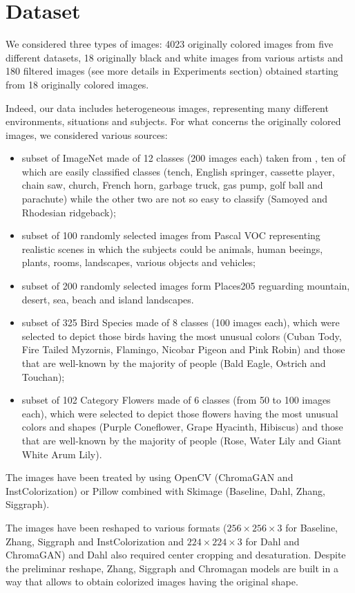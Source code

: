 \section{Dataset}
We considered three types of images: 4023 originally colored images from five different datasets, 18 originally black and white images from various artists and 180 filtered images (see more details in Experiments section) obtained starting from 18 originally colored images.

Indeed, our data includes heterogeneous images, representing many different environments, situations and subjects.
For what concerns the originally colored images, we considered various sources:
\begin{itemize}
	\item subset of ImageNet made of 12 classes (200 images each) taken from \cite{imagenette}, ten of which are easily classified classes (tench, English springer, cassette player, chain saw, church, French horn, garbage truck, gas pump, golf ball and parachute) while the other two are not so easy to classify (Samoyed and Rhodesian ridgeback);
	\item subset of 100 randomly selected images from Pascal VOC \cite{pascal} representing realistic scenes in which the subjects could be animals, human beeings, plants, rooms, landscapes, various objects and vehicles;
	\item subset of 200 randomly selected images form Places205 \cite{place} reguarding mountain, desert, sea, beach and island landscapes.
	\item subset of 325 Bird Species \cite{bird} made of 8 classes (100 images each), which were selected to depict those birds having the most unusual colors (Cuban Tody, Fire Tailed Myzornis, Flamingo, Nicobar Pigeon and Pink Robin) and those that are well-known by the majority of people (Bald Eagle, Ostrich and Touchan);
	\item subset of 102 Category Flowers \cite{flower} made of 6 classes (from 50 to 100 images each), which were selected to depict those flowers having the most unusual colors and shapes (Purple Coneflower, Grape Hyacinth, Hibiscus) and those that are well-known by the majority of people (Rose, Water Lily and Giant White Arum Lily).
\end{itemize}

The images have been treated by using OpenCV (ChromaGAN and InstColorization) or Pillow combined with Skimage (Baseline, Dahl, Zhang, Siggraph).

The images have been reshaped to various formats ($256\times256\times3$ for Baseline, Zhang, Siggraph and InstColorization and $224\times224\times3$ for Dahl and ChromaGAN) and Dahl also required center cropping and desaturation. Despite the preliminar reshape, Zhang, Siggraph and Chromagan models are built in a way that allows to obtain colorized images having the original shape.

